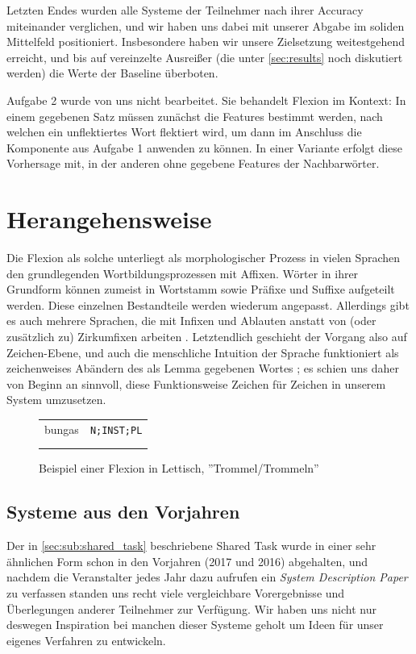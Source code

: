 \documentclass[11pt,a4paper]{article}
\begin{document}
Letzten Endes wurden alle Systeme der Teilnehmer nach ihrer Accuracy miteinander verglichen, und wir haben uns dabei mit unserer Abgabe im soliden Mittelfeld positioniert. Insbesondere haben wir unsere Zielsetzung weitestgehend erreicht, und bis auf vereinzelte Ausreißer (die unter \autoref{sec:results} noch diskutiert werden) die Werte der Baseline überboten.

Aufgabe 2 wurde von uns nicht bearbeitet. Sie behandelt Flexion im Kontext: In einem gegebenen Satz müssen zunächst die Features bestimmt werden, nach welchen ein unflektiertes Wort flektiert wird, um dann im Anschluss die Komponente aus Aufgabe 1 anwenden zu können. In einer Variante erfolgt diese Vorhersage mit, in der anderen ohne gegebene Features der Nachbarwörter.

\section{Herangehensweise}
\label{sec:approach}

Die Flexion als solche unterliegt als morphologischer Prozess in vielen Sprachen den grundlegenden Wortbildungsprozessen mit Affixen.
Wörter in ihrer Grundform können zumeist in Wortstamm sowie Präfixe und Suffixe aufgeteilt werden. Diese einzelnen Bestandteile werden wiederum angepasst.
Allerdings gibt es auch mehrere Sprachen, die mit Infixen und Ablauten anstatt von (oder zusätzlich zu) Zirkumfixen arbeiten \citep{inflection_seq}.
Letztendlich geschieht der Vorgang also auf Zeichen-Ebene, und auch die menschliche Intuition der Sprache funktioniert als zeichenweises Abändern des als Lemma gegebenen Wortes \citep{pinker:2015:words}; es schien uns daher von Beginn an sinnvoll, diese Funktionsweise Zeichen für Zeichen in unserem System umzusetzen.

\begin{figure}[htb]
\centering
\begin{tabular}{cc}
bungas & \texttt{N;INST;PL}\\  \addlinespace
\multicolumn{2}{c}{$\Downarrow$}\\ \addlinespace
\multicolumn{2}{c}{bungām}
\end{tabular}
\caption{Beispiel einer Flexion in Lettisch, ''Trommel/Trommeln''}
\label{fig:example-inflection}
\end{figure}

\subsection{Systeme aus den Vorjahren}
Der in \autoref{sec:sub:shared_task} beschriebene Shared Task wurde in einer sehr ähnlichen Form schon in den Vorjahren (2017 und 2016) abgehalten, und nachdem die Veranstalter jedes Jahr dazu aufrufen ein \textit{System Description Paper} zu verfassen standen uns recht viele vergleichbare Vorergebnisse und Überlegungen anderer Teilnehmer zur Verfügung. Wir haben uns nicht nur deswegen Inspiration bei manchen dieser Systeme geholt um Ideen für unser eigenes Verfahren zu entwickeln.
\end{document}
